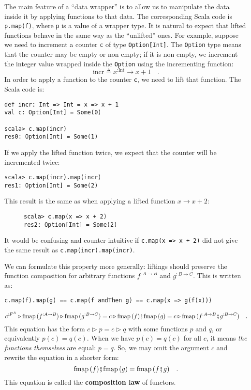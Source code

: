 The main feature of a \textsf{``}data wrapper\textsf{''} is to allow us to manipulate
the data inside it by applying functions to that data. The corresponding
Scala code is \lstinline!p.map(f)!, where \lstinline!p! is a value
of a wrapper type. It is natural to expect that lifted functions behave
in the same way as the \textsf{``}unlifted\textsf{''} ones. For example, suppose we
need to increment a counter \lstinline!c! of type \lstinline!Option[Int]!.
The \lstinline!Option! type means that the counter may be empty or
non-empty; if it is non-empty, we increment the integer value wrapped
inside the \lstinline!Option! using the incrementing function:
\[
\text{incr}\triangleq x^{:\text{Int}}\rightarrow x+1\quad.
\]
In order to apply a function to the counter \lstinline!c!, we need
to lift that function. The Scala code is:
\begin{lstlisting}
def incr: Int => Int = x => x + 1
val c: Option[Int] = Some(0)

scala> c.map(incr)
res0: Option[Int] = Some(1) 
\end{lstlisting}
If we apply the lifted function twice, we expect that the counter
will be incremented twice:
\begin{lstlisting}
scala> c.map(incr).map(incr)
res1: Option[Int] = Some(2)
\end{lstlisting}
This result is the same as when applying a lifted function $x\rightarrow x+2$:

\begin{wrapfigure}{l}{0.3\columnwidth}%
\vspace{-0.8\baselineskip}
\begin{lstlisting}
scala> c.map(x => x + 2)
res2: Option[Int] = Some(2)
\end{lstlisting}
\vspace{-1.2\baselineskip}
\end{wrapfigure}%

\noindent It would be confusing and counter-intuitive if \lstinline!c.map(x => x + 2)!
did not give the same result as \lstinline!c.map(incr).map(incr)!. 

We can formulate this property more generally: liftings should preserve
the function composition for arbitrary functions $f^{:A\rightarrow B}$
and $g^{:B\rightarrow C}$. This is written as:
\begin{lstlisting}
c.map(f).map(g) == c.map(f andThen g) == c.map(x => g(f(x))) 
\end{lstlisting}
\[
c^{:F^{A}}\triangleright\text{fmap}\,(f^{:A\rightarrow B})\triangleright\text{fmap}\,(g^{:B\rightarrow C})=c\triangleright\text{fmap}\,(f)\bef\text{fmap}\,(g)=c\triangleright\text{fmap}\,(f^{:A\rightarrow B}\bef g^{:B\rightarrow C})\quad.
\]
This equation has the form $c\triangleright p=c\triangleright q$
with some functions $p$ and $q$, or equivalently $p(c)=q(c)$. When
we have $p(c)=q(c)$ for all $c$, it means \emph{the functions themselves}
are equal: $p=q$. So, we may omit
the argument $c$ and rewrite the equation in a shorter form:
\[
\text{fmap}\,(f)\bef\text{fmap}\,(g)=\text{fmap}\,(f\bef g)\quad.
\]
This equation is called the \textbf{composition law}
of functors. 

